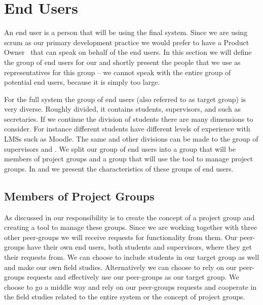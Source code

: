 \section{End Users}
\label{sec:enduser}
An end user is a person that will be using the final system.
Since we are using scrum as our primary development practice we would prefer to have a Product Owner~\cite[p.~115]{Larman04} that can speak on behalf of the end users.
In this section we will define the group of end users for our \subsystem{} and shortly present the people that we use as representatives for this group -- we cannot speak with the entire group of potential end users, because it is simply too large.

For the full system the group of end users (also referred to as target group) is very diverse.
Roughly divided, it contains students, supervisors, and \admpers{} such as secretaries.
If we continue the division of students there are many dimensions to consider. 
For instance different students have different levels of experience with LMSs such as Moodle.
The same and other divisions can be made to the group of supervisors and \admpers{}.
We split our group of end users into a group that will be members of project groups and a group that will use the tool to manage project groups.
In  and  we present the characteristics of these groups of end users.

\subsection{Members of Project Groups}
\label{sub:endusersmembers}
As discussed in  our responsibility is to create the concept of a project group and creating a tool to manage these groups.
Since we are working together with three other peer-groups we will receive requests for functionality from them.
Our peer-groups have their own end users, both students and supervisors, where they get their requests from.
We can choose to include students in our target group as well and make our own field studies.
Alternatively we can choose to rely on our peer-groups requests and effectively use our peer-groups as our target group.
We choose to go a middle way and rely on our peer-groups requests and cooperate in the field studies related to the entire system or the concept of project groups.


